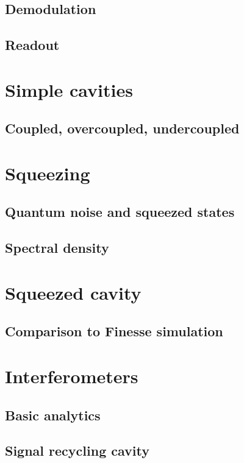\documentclass[pra,superscriptaddress,reprint,nofootinbib]{revtex4-1}
\begin{document}
\subsection{Demodulation}
\subsection{Readout}


\section{Simple cavities}
\subsection{Coupled, overcoupled, undercoupled}


\section{Squeezing}
\subsection{Quantum noise and squeezed states}
\subsection{Spectral density}


\section{Squeezed cavity}
\subsection{Comparison to Finesse simulation}


\section{Interferometers}
\subsection{Basic analytics}
\subsection{Signal recycling cavity}
\end{document}
